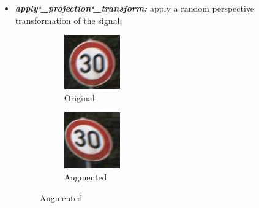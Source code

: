 \begin{itemize}
\item \textbf{\textit{apply\char`_projection\char`_transform:}} apply a random perspective transformation of the signal;
\begin{figure}[!ht]
\centering
\begin{subfigure}{.2\textwidth}
  \centering
  \includegraphics[width=.8\linewidth]{img/00001_00011_00027.png}
  \caption{Original}
  \label{fig:sub1}
\end{subfigure}%
\begin{subfigure}{.2\textwidth}
  \centering
  \includegraphics[width=.8\linewidth]{img/4.png}
  \caption{Augmented}
  \label{fig:sub2}
\end{subfigure}
\end{figure}
\end{itemize}
